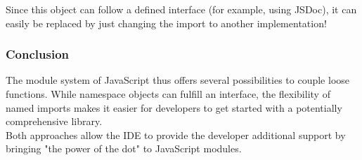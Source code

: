 Since this object can follow a defined interface (for example, using JSDoc), it
can easily be replaced by just changing the import to another implementation!

\subsubsection{Conclusion} %
\label{subsub:Conclusion}
The module system of JavaScript thus offers several possibilities to couple
loose functions. While namespace objects can fulfill an interface, the
flexibility of named imports makes it easier for developers to get started with
a potentially comprehensive library. \\ 
Both approaches allow the IDE to provide the developer additional support by
bringing "the power of the dot" to JavaScript modules.

